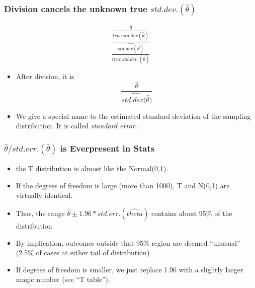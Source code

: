 \documentclass[10pt,english]{beamer}
\begin{document}
\begin{frame}
  \frametitle{Division cancels the unknown true $std.dev.(\hat{\theta})$ }

  \begin{equation}
\frac{\frac{\hat{\theta}}{true\, std.dev(\hat{\theta})}}{\frac{\widehat{std.dev(\hat{\theta})}}{true\, std.dev.(\hat{\theta})}}
\end{equation}
\begin{itemize}
  \item After division, it is
    \begin{equation}
      \frac{\hat{\theta}}{\widehat{std.dev(\hat{\theta}})}
    \end{equation}
  \item We give a special name to the estimated standard deviation of
    the sampling distribution. It is called \emph{standard error.}
  \end{itemize}
\end{frame}

\begin{frame}
  \frametitle{$\hat{\theta}/std.err.(\hat{\theta})$ is Everpresent in Stats}
  \begin{itemize}
  \item the T distribution is almost like the Normal(0,1).
  \item If the degrees of freedom is large (more than 1000), T and
    N(0,1) are virtually identical.
  \item Thus, the range $\hat{\theta} \pm
    1.96*std.err.(\hat{theta})$ contains about 95\% of the distribution
  \item By implication, outcomes outside that 95\% region are deemed
    ``unusual'' (2.5\% of cases at either tail of distribution)
  \item If degrees of freedom is smaller, we just replace 1.96 with a
    slightly larger magic number (see ``T table'').
  \end{itemize}
\end{frame}
\end{document}

